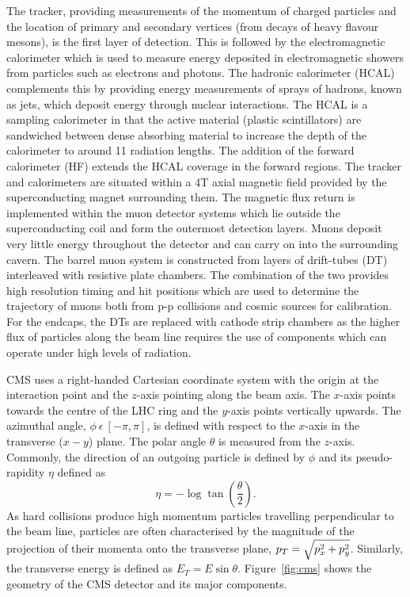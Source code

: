 The tracker, providing measurements of the momentum of charged particles and the location of 
primary and secondary vertices (from decays of heavy flavour mesons), is the first layer of detection.
This is followed by the electromagnetic calorimeter which is used to measure
energy deposited in electromagnetic showers from particles such as electrons and photons. 
The hadronic calorimeter (HCAL) complements this by providing energy measurements of 
sprays of hadrons, known as jets, which deposit energy through nuclear interactions. 
The HCAL is a sampling calorimeter in that the active material (plastic scintillators)
are sandwiched between dense absorbing material to increase the depth of the calorimeter to
around 11 radiation lengths. The addition of the forward calorimeter (HF) extends the HCAL
coverage in the forward regions.  
The tracker and calorimeters are situated within a 4T axial magnetic field 
provided by the superconducting magnet surrounding them.
The magnetic flux return is implemented within the  muon detector systems which lie outside 
the superconducting coil and form the outermost detection layers. Muons deposit very little energy 
throughout the detector and can carry on into the surrounding cavern.
The barrel muon system is constructed from layers of drift-tubes (DT) interleaved with 
resistive plate chambers. The combination of the two provides high resolution
timing and hit positions which are used to determine the trajectory of muons both from
p-p collisions and cosmic sources for calibration. For the endcaps, the DTs are replaced
with cathode strip chambers as the higher flux of particles along the beam line
requires the use of components which can operate under high levels of radiation.

CMS uses a right-handed Cartesian coordinate system with the origin at the 
interaction point and the $z$-axis pointing along the beam axis. The $x$-axis points towards 
the centre of the LHC ring and the $y$-axis points vertically upwards. The azimuthal angle, 
$\phi~\epsilon~[-\pi,\pi]$, is defined with respect to the $x$-axis in the 
transverse ($x-y$) plane. The polar angle $\theta$ is measured from the $z$-axis. Commonly,
the direction of an outgoing particle is defined by $\phi$ and its pseudo-rapidity $\eta$ 
defined as 
\begin{equation}
	\eta=-\log \tan \left( \frac{\theta}{2} \right).
\end{equation}
As hard collisions produce high momentum particles travelling perpendicular to the beam line, 
particles are often characterised
by the magnitude of the projection of their momenta onto the transverse plane, 
$p_{T}=\sqrt{p_{x}^{2}+p_{y}^{2}}$.
Similarly, the transverse energy is defined as $E_{T}=E\sin\theta$.
Figure~\ref{fig:cms} shows the geometry of the CMS detector and its major components. 

